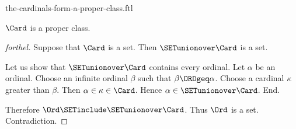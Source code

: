 \documentclass{naproche-library}
\begin{document}
\begin{smodule}[title=The Cardinals Form a Proper Class -- Cantor's First Paradox]{the-cardinals-form-a-proper-class.ftl}

\begin{theorem}[forthel,title=Cantor's First Paradox,id=cantor_paradox_1]
  $\Card$ is a proper class.
\end{theorem}
\begin{proof}[forthel]
  Suppose that $\Card$ is a set.
  Then $\SETunionover \Card$ is a set.

  Let us show that $\SETunionover \Card$ contains every ordinal.
    Let $\alpha$ be an ordinal.
    Choose an infinite ordinal $\beta$ such that $\beta \ORDgeq \alpha$.
    Choose a cardinal $\kappa$ greater than $\beta$.
    Then $\alpha \in \kappa \in \Card$.
    Hence $\alpha \in \SETunionover \Card$.
  End.

  Therefore $\Ord \SETinclude \SETunionover \Card$.
  Thus $\Ord$ is a set.
  Contradiction.
\end{proof}
\end{smodule}
\end{document}
